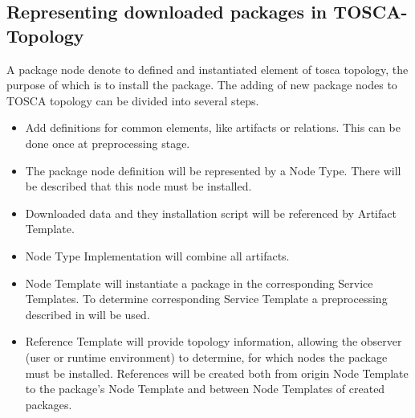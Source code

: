 \subsection{Representing downloaded packages in TOSCA-Topology} \label{subs:repres}
A package node denote to defined and instantiated element of \gls{tosca} topology, the purpose of which is to install the package.
The adding of new package nodes to TOSCA topology can be divided into several steps.
\begin{itemize}
	\item Add definitions for common elements, like artifacts or relations. This can be done once at preprocessing stage.
	\item The package node definition will be represented by a Node Type. There will be described that this node must be installed.
	\item Downloaded data and they installation script will be referenced by Artifact Template.
	\item Node Type Implementation will combine all artifacts.
	\item Node Template will instantiate a package in the corresponding Service Templates.
		To determine corresponding Service Template a preprocessing described in  will be used.
	\item Reference Template will provide topology information, allowing the observer (user or runtime environment) to determine, for which nodes the package must be installed.
		References will be created both from origin Node Template to the package's Node Template and between Node Templates of created packages.
\end{itemize}
